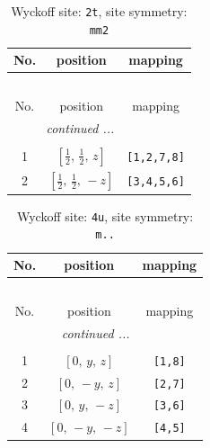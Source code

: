 \documentclass[fleqn,8pt]{jsarticle}
\begin{document}
\renewcommand{\arraystretch}{1.2}
\begin{longtable}{ccc}
\caption{Wyckoff site: {\tt 2t}, site symmetry: {\tt mm2}}
 \\
 \hline \hline
No. & position & mapping \\ \hline \endfirsthead

\multicolumn{2}{l}{\tablename\ \thetable{}} \\
 \hline \hline
No. & position & mapping \\ \hline \endhead

 \hline \hline
\multicolumn{2}{r}{\footnotesize\it continued ...} \\ \endfoot

 \hline \hline
\multicolumn{2}{r}{} \\ \endlastfoot

1 & $\left[ \frac{1}{2},\, \frac{1}{2},\, z \right]$ & {\tt [1,2,7,8]} \\ \hline
2 & $\left[ \frac{1}{2},\, \frac{1}{2},\, - z \right]$ & {\tt [3,4,5,6]} \\
\end{longtable}
\renewcommand{\arraystretch}{1.2}
\begin{longtable}{ccc}
\caption{Wyckoff site: {\tt 4u}, site symmetry: {\tt m..}}
 \\
 \hline \hline
No. & position & mapping \\ \hline \endfirsthead

\multicolumn{2}{l}{\tablename\ \thetable{}} \\
 \hline \hline
No. & position & mapping \\ \hline \endhead

 \hline \hline
\multicolumn{2}{r}{\footnotesize\it continued ...} \\ \endfoot

 \hline \hline
\multicolumn{2}{r}{} \\ \endlastfoot

1 & $\left[ 0,\, y,\, z \right]$ & {\tt [1,8]} \\ \hline
2 & $\left[ 0,\, - y,\, z \right]$ & {\tt [2,7]} \\ \hline
3 & $\left[ 0,\, y,\, - z \right]$ & {\tt [3,6]} \\ \hline
4 & $\left[ 0,\, - y,\, - z \right]$ & {\tt [4,5]} \\
\end{longtable}
\renewcommand{\arraystretch}{1.2}
\end{document}
